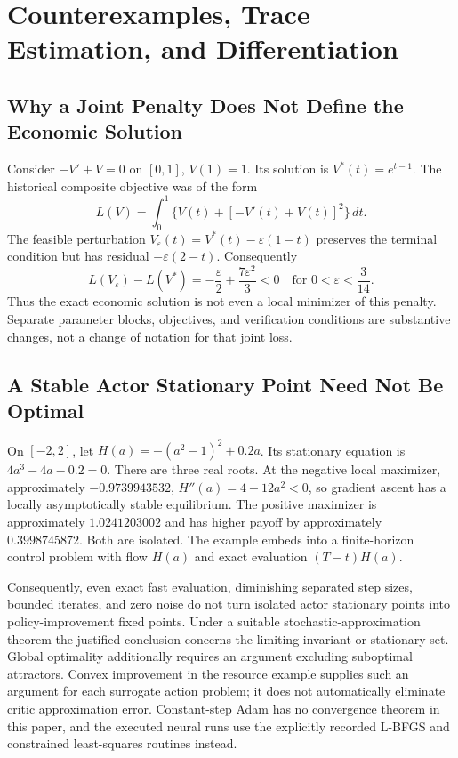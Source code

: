 \section{Counterexamples, Trace Estimation, and Differentiation}
\subsection{Why a Joint Penalty Does Not Define the Economic Solution}
Consider $-V'+V=0$ on $[0,1]$, $V(1)=1$. Its solution is $V^*(t)=e^{t-1}$. The historical composite objective was of the form
\[
 L(V)=\int_0^1\{V(t)+[-V'(t)+V(t)]^2\}\,dt.
\]
The feasible perturbation $V_\varepsilon(t)=V^*(t)-\varepsilon(1-t)$ preserves the terminal condition but has residual $-\varepsilon(2-t)$. Consequently
\[
 L(V_\varepsilon)-L(V^*)=-\frac{\varepsilon}{2}+\frac{7\varepsilon^2}{3}<0
 \quad\text{for }0<\varepsilon<\frac{3}{14}.
\]
Thus the exact economic solution is not even a local minimizer of this penalty. Separate parameter blocks, objectives, and verification conditions are substantive changes, not a change of notation for that joint loss.

\subsection{A Stable Actor Stationary Point Need Not Be Optimal}
On $[-2,2]$, let $H(a)=-(a^2-1)^2+0.2a$. Its stationary equation is $4a^3-4a-0.2=0$. There are three real roots. At the negative local maximizer, approximately $-0.9739943532$, $H''(a)=4-12a^2<0$, so gradient ascent has a locally asymptotically stable equilibrium. The positive maximizer is approximately $1.0241203002$ and has higher payoff by approximately $0.3998745872$. Both are isolated. The example embeds into a finite-horizon control problem with flow $H(a)$ and exact evaluation $(T-t)H(a)$.

Consequently, even exact fast evaluation, diminishing separated step sizes, bounded iterates, and zero noise do not turn isolated actor stationary points into policy-improvement fixed points. Under a suitable stochastic-approximation theorem the justified conclusion concerns the limiting invariant or stationary set. Global optimality additionally requires an argument excluding suboptimal attractors. Convex improvement in the resource example supplies such an argument for each surrogate action problem; it does not automatically eliminate critic approximation error. Constant-step Adam has no convergence theorem in this paper, and the executed neural runs use the explicitly recorded L-BFGS and constrained least-squares routines instead.

